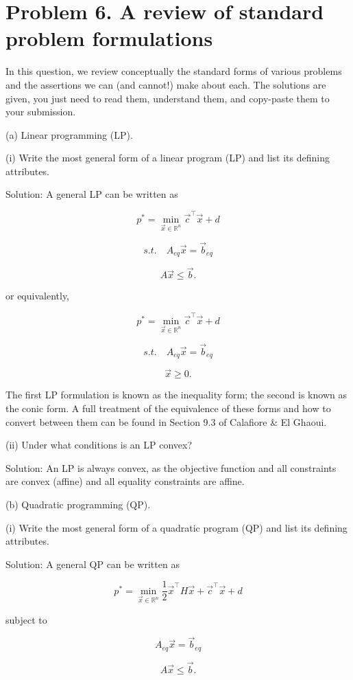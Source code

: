 \documentclass[
	12pt,
]{fphw}
\begin{document}
\newpage
\section*{Problem 6. A review of standard problem formulations}

In this question, we review conceptually the standard forms of various problems and the assertions we can (and cannot!) make about each. The solutions are given, you just need to read them, understand them, and copy-paste them to your submission.

(a) Linear programming (LP).

(i) Write the most general form of a linear program (LP) and list its defining attributes.

Solution: A general LP can be written as

\[
p^* = \min_{\vec{x} \in \mathbb{R}^n} \vec{c}^\top \vec{x} + d
\]


\[
s.t.\quad A_{eq} \vec{x} = \vec{b}_{eq}
\]

\[
A \vec{x} \le \vec{b}.
\]

or equivalently,

\[
p^* = \min_{\vec{x} \in \mathbb{R}^n} \vec{c}^\top \vec{x} + d
\]

\[
s.t.\quad A_{eq} \vec{x} = \vec{b}_{eq}
\]

\[
\vec{x} \ge 0.
\]

The first LP formulation is known as the inequality form; the second is known as the conic form. A full treatment of the equivalence of these forms and how to convert between them can be found in Section 9.3 of Calafiore \& El Ghaoui.

(ii) Under what conditions is an LP convex?

Solution: An LP is always convex, as the objective function and all constraints are convex (affine) and all equality constraints are affine.


\vspace{30pt}
(b) Quadratic programming (QP).

(i) Write the most general form of a quadratic program (QP) and list its defining attributes.

Solution: A general QP can be written as

\[
p^* = \min_{\vec{x} \in \mathbb{R}^n} \frac{1}{2}\vec{x}^\top H \vec{x} + \vec{c}^\top \vec{x} + d
\]

subject to

\[
A_{eq} \vec{x} = \vec{b}_{eq}
\]

\[
A \vec{x} \le \vec{b}.
\]
\end{document}
